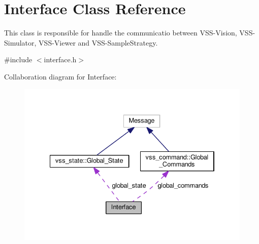 \hypertarget{classInterface}{}\section{Interface Class Reference}
\label{classInterface}


This class is responsible for handle the communicatio between V\+S\+S-\/\+Vision, V\+S\+S-\/\+Simulator, V\+S\+S-\/\+Viewer and V\+S\+S-\/\+Sample\+Strategy.  




{\ttfamily \#include $<$interface.\+h$>$}



Collaboration diagram for Interface\+:\nopagebreak
\begin{figure}[H]
\begin{center}
\leavevmode
\includegraphics[width=334pt]{classInterface__coll__graph}
\end{center}
\end{figure}
